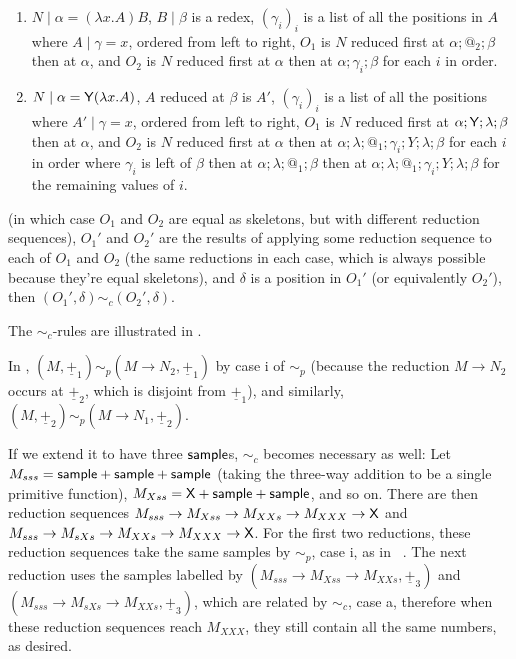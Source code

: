\begin{definition}
\begin{asparaenum}[(i)]
\begin{enumerate}
        \item $N \mid \alpha = (\lambda x. A) B$, $B \mid \beta$ is a redex, $(\gamma_i)_i$ is a list of all the positions in $A$ where $A \mid \gamma = x$, ordered from left to right, $O_1$ is $N$ reduced first at $\alpha ; @_2 ; \beta$ then at $\alpha$, and $O_2$ is $N$ reduced first at $\alpha$ then at $\alpha;\gamma_i;\beta$ for each $i$ in order.
        
        \item $N \mid \alpha = \mathsf{Y} (\lambda x. A)$, $A$ reduced at $\beta$ is $A'$, $(\gamma_i)_i$ is a list of all the positions where $A' \mid \gamma  = x$, ordered from left to right, $O_1$ is $N$ reduced first at $\alpha;\mathsf{Y};\lambda;\beta$ then at $\alpha$, and $O_2$ is $N$ reduced first at $\alpha$ then at $\alpha;\lambda;@_1;\gamma_i;Y;\lambda;\beta$ for each $i$ in order where $\gamma_i$ is left of $\beta$ then at $\alpha;\lambda;@_1;\beta$ then at $\alpha;\lambda;@_1;\gamma_i;Y;\lambda;\beta$ for the remaining values of $i$.
    \end{enumerate}
    (in which case $O_1$ and $O_2$ are equal as skeletons, but with different reduction sequences), $O_1'$ and $O_2'$ are the results of applying some reduction sequence to each of $O_1$ and $O_2$ (the same reductions in each case, which is always possible because they're equal skeletons), and $\delta$ is a position in $O_1'$ (or equivalently $O_2'$), then $(O_1',\delta) \sim_c (O_2',\delta)$.
\end{asparaenum}
The $\sim_c$-rules are illustrated in .
\end{definition}

\begin{example}
In , $(M,\underline{+}_1) \sim_p (M \to N_2,\underline{+}_1)$ by case i of $\sim_p$ (because the reduction $M \to N_2$ occurs at $\underline{+}_2$, which is disjoint from $\underline{+}_1$), and similarly, $(M,\underline{+}_2) \sim_p (M \to N_1,\underline{+}_2)$.

If we extend it to have three $\mathsf{sample}$s, $\sim_c$ becomes necessary as well: Let $M_{sss} = \mathsf{sample} + \mathsf{sample} + \mathsf{sample}$ (taking the three-way addition to be a single primitive function), $M_{Xss} = \mathsf{X} + \mathsf{sample} + \mathsf{sample}$, and so on. There are then reduction sequences $M_{sss} \to M_{Xss} \to M_{XXs} \to M_{XXX} \to \mathsf{X}$ and $M_{sss} \to M_{sXs} \to M_{XXs} \to M_{XXX} \to \mathsf{X}$. For the first two reductions, these reduction sequences take the same samples by $\sim_p$, case i, as in ~. The next reduction uses the samples labelled by $(M_{sss} \to M_{Xss} \to M_{XXs}, \underline{+}_3)$ and $(M_{sss} \to M_{sXs} \to M_{XXs}, \underline{+}_3)$, which are related by $\sim_c$, case a, therefore when these reduction sequences reach $M_{XXX}$, they still contain all the same numbers, as desired.
\end{example}

